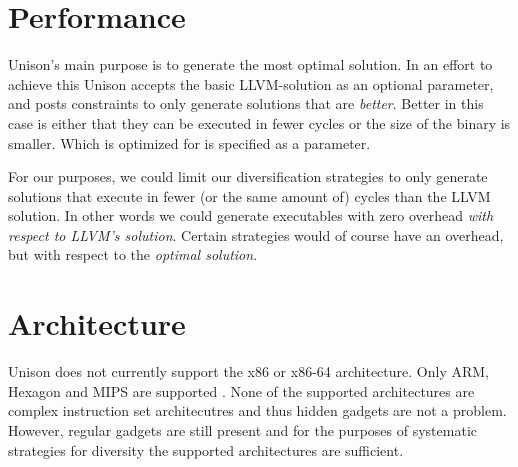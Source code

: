 \section{Performance}

Unison's main purpose is to generate the most optimal solution. In an effort to achieve
this Unison accepts the basic LLVM-solution as an optional parameter, and posts constraints
to only generate solutions that are \textit{better}. Better in this case is either that
they can be executed in fewer cycles or the size of the binary is smaller. Which is optimized
for is specified as a parameter.

For our purposes, we could limit our diversification strategies to only generate solutions
that execute in fewer (or the same amount of) cycles than the LLVM solution. In other words
we could generate executables with zero overhead \textit{with respect to LLVM's solution}.
Certain strategies would of course have an overhead, but with respect to the \textit{optimal
solution}.

\section{Architecture}

Unison does not currently support the x86 or x86-64 architecture. Only ARM, Hexagon and MIPS
are supported \cite{unison-src}. None of the supported architectures are complex instruction
set architecutres and thus hidden gadgets are not a problem. However, regular gadgets are
still present and for the purposes of systematic strategies for diversity the supported
architectures are sufficient.
